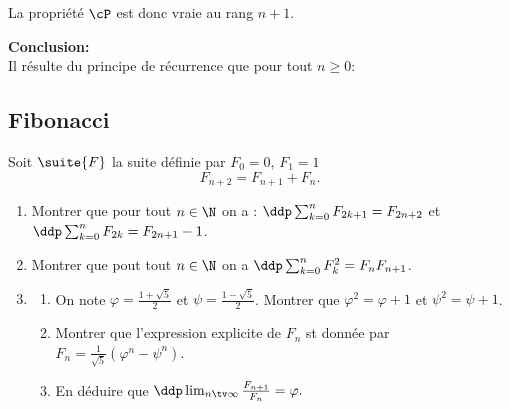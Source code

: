 \begin{correction}
\begin{enumerate}
\begin{enumerate}
La propriété $\cP$ est donc vraie au rang $n+1$.

\textbf{Conclusion:}\\
Il r\'esulte du principe de r\'ecurrence que pour tout $ n\geq 0$:
\begin{center}
\end{center}




\end{enumerate}



\end{enumerate}
\end{correction}





\subsection{Fibonacci}

\begin{exercice}
Soit $\suite{F}$ la suite définie par $F_0 =0, \, F_1=1 $  
$$ F_{n+2} = F_{n+1} +F_n.$$

\begin{enumerate}
\item Montrer que pour tout $n\in \N$ on a : $\ddp \sum_{k=0}^n F_{2k+1} =F_{2n+2}$
et $\ddp \sum_{k=0}^n F_{2k} =F_{2n+1}-1$.
\item Montrer que pout tout $n\in \N$ on a $\ddp \sum_{k=0}^n F_{k}^2 =F_nF_{n+1}$.
\item \begin{enumerate}
\item On note $\varphi = \frac{1+\sqrt{5}}{2}$ et $\psi=\frac{1-\sqrt{5}}{2}$. Montrer que 
$\varphi^2 =\varphi+1$ et $\psi^2 =\psi+1$.
\item Montrer que l'expression explicite de $F_n$ st donnée par $F_n =\frac{1}{\sqrt{5}}(\varphi^n-\psi^n)$.
\item En déduire que $\ddp \lim_{n\tv \infty} \frac{F_{n+1}}{F_n}=\varphi.$
\end{enumerate}
\end{enumerate}

\end{exercice}


